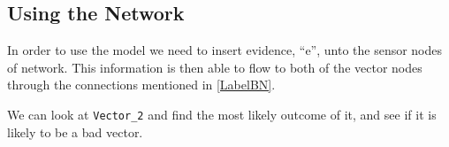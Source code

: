 
\subsection{Using the Network}

In order to use the model we need to insert evidence, ``e'', unto the sensor
nodes of network. This information is then able to flow to both of the vector
nodes through the connections mentioned in \autoref{LabelBN}.


We can look at \texttt{Vector\_2} and find the most likely outcome of it, and
see if it is likely to be a bad vector.


